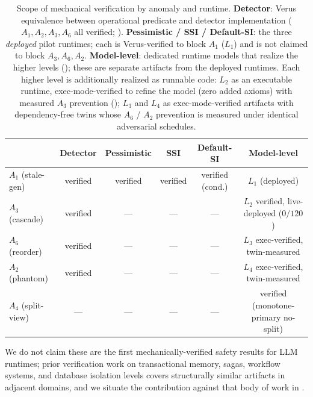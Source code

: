 \documentclass[journal,compsoc,10pt]{IEEEtran}
\theoremstyle{definition}
\theoremstyle{remark}
\begin{document}
\begin{table}[t]
\centering
\caption{Scope of mechanical verification by anomaly and runtime.
\textbf{Detector}: Verus equivalence between operational predicate and
detector implementation ($A_1, A_2, A_3, A_6$ all verified;
). \textbf{Pessimistic / SSI / Default-SI}:
the three \emph{deployed} pilot runtimes; each is Verus-verified to
block $A_1$ ($L_1$) and is not claimed to block $A_3, A_6, A_2$.
\textbf{Model-level}: dedicated runtime models that realize the higher
levels (); these are
separate artifacts from the deployed runtimes. Each higher level is additionally realized as runnable code: $L_2$ as an
executable runtime, exec-mode-verified to refine the model (zero added
axioms) with measured $A_3$ prevention (); $L_3$
and $L_4$ as exec-mode-verified artifacts with dependency-free twins
whose $A_6$ / $A_2$ prevention is measured under identical adversarial
schedules.}
\label{tab:verification-scope}
\small
\begin{tabular}{lccccc}
\toprule
& Detector & Pessimistic & SSI & Default-SI & Model-level \\
\midrule
$A_1$ (stale-gen)   & verified & verified & verified & verified (cond.) & $L_1$ (deployed) \\
$A_3$ (cascade)     & verified & ---     & ---     & ---               & $L_2$ verified, live-deployed ($0/120$) \\
$A_6$ (reorder)     & verified & ---     & ---     & ---               & $L_3$ exec-verified, twin-measured \\
$A_2$ (phantom)     & verified & ---     & ---     & ---               & $L_4$ exec-verified, twin-measured \\
$A_4$ (split-view)  & ---      & ---     & ---     & ---               & verified (monotone-primary no-split) \\
\bottomrule
\end{tabular}
\end{table}

We do not claim these are the first
mechanically-verified safety results for LLM runtimes; prior
verification work on transactional memory, sagas, workflow
systems, and database isolation levels covers structurally
similar artifacts in adjacent domains, and we situate the
contribution against that body of work in .
\end{document}
